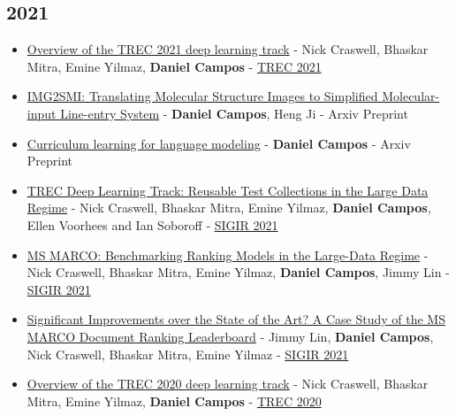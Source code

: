 \documentclass[line,margin]{res}
\begin{document}
\begin{resume}
\subsection{2021}
\begin{itemize}
    \item \href{https://www.microsoft.com/en-us/research/uploads/prod/2022/05/trec2021-deeplearning-overview.pdf}{Overview of the TREC 2021 deep learning track} - Nick Craswell, Bhaskar Mitra, Emine Yilmaz, \textbf{Daniel Campos} - \href{https://trec.nist.gov/tracks.html}{TREC 2021}
    \item \href{https://arxiv.org/abs/2109.04202}{IMG2SMI: Translating Molecular Structure Images to Simplified Molecular-input Line-entry System} - \textbf{Daniel Campos}, Heng Ji - Arxiv Preprint
    \item \href{https://arxiv.org/abs/2108.02170}{Curriculum learning for language modeling} - \textbf{Daniel Campos} - Arxiv Preprint
    \item \href{https://arxiv.org/abs/2104.09399}{TREC Deep Learning Track: Reusable Test Collections in the Large Data Regime} - Nick Craswell, Bhaskar Mitra, Emine Yilmaz, \textbf{Daniel Campos}, Ellen Voorhees and Ian Soboroff - \href{https://sigir.org/sigir2021/}{SIGIR 2021}
    \item \href{https://dl.acm.org/doi/10.1145/3404835.3462804}{MS MARCO: Benchmarking Ranking Models in the Large-Data Regime} -  Nick Craswell, Bhaskar Mitra, Emine Yilmaz, \textbf{Daniel Campos}, Jimmy Lin - \href{https://sigir.org/sigir2021/}{SIGIR 2021}
    \item \href{https://arxiv.org/abs/2102.12887}{Significant Improvements over the State of the Art? A Case Study of the MS MARCO Document Ranking Leaderboard} - Jimmy Lin, \textbf{Daniel Campos}, Nick Craswell, Bhaskar Mitra, Emine Yilmaz  - \href{https://sigir.org/sigir2021/}{SIGIR 2021}
    \item \href{https://trec.nist.gov/pubs/trec29/papers/OVERVIEW.DL.pdf}{Overview of the TREC 2020 deep learning track} - Nick Craswell, Bhaskar Mitra, Emine Yilmaz, \textbf{Daniel Campos} - \href{https://trec.nist.gov/tracks.html}{TREC 2020}
\end{itemize}

\end{resume}
\end{document}
